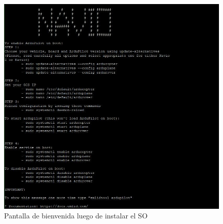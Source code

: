 		
		\begin{figure}[h!]
			\centering
			\includegraphics[width=0.8\linewidth, height=0.37\textheight]{Imagenes/pantallaInicio}
			\caption{Pantalla de bienvenida luego de instalar el SO}
			\label{fig:pantallainicio}
		\end{figure}
		

